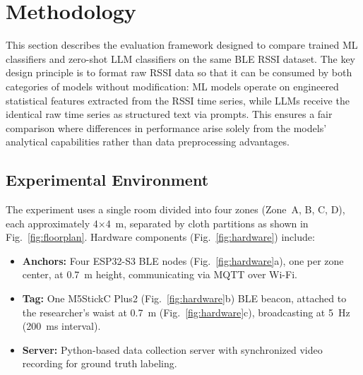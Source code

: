 \documentclass[conference]{IEEEtran}
\begin{document}
\section{Methodology}

This section describes the evaluation framework designed to compare trained ML classifiers and zero-shot LLM classifiers on the same BLE RSSI dataset. The key design principle is to format raw RSSI data so that it can be consumed by both categories of models without modification: ML models operate on engineered statistical features extracted from the RSSI time series, while LLMs receive the identical raw time series as structured text via prompts. This ensures a fair comparison where differences in performance arise solely from the models' analytical capabilities rather than data preprocessing advantages.

\subsection{Experimental Environment}

The experiment uses a single room divided into four zones (Zone~A, B, C, D), each approximately 4$\times$4~m, separated by cloth partitions as shown in Fig.~\ref{fig:floorplan}. Hardware components (Fig.~\ref{fig:hardware}) include:
\begin{itemize}
    \item \textbf{Anchors:} Four ESP32-S3 BLE nodes (Fig.~\ref{fig:hardware}a), one per zone center, at 0.7~m height, communicating via MQTT over Wi-Fi.
    \item \textbf{Tag:} One M5StickC Plus2 (Fig.~\ref{fig:hardware}b) BLE beacon, attached to the researcher's waist at 0.7~m (Fig.~\ref{fig:hardware}c), broadcasting at 5~Hz (200~ms interval).
    \item \textbf{Server:} Python-based data collection server with synchronized video recording for ground truth labeling.
\end{itemize}
\end{document}
